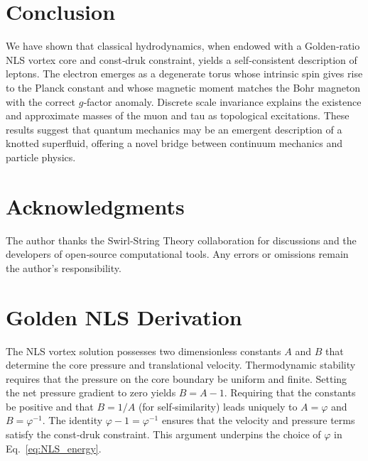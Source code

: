 \documentclass[11pt]{article}
\newcommand{\phiG}{\varphi}
\begin{document}


\section{Conclusion}


We have shown that classical hydrodynamics, when endowed with a Golden‑ratio NLS vortex core and const‑druk constraint, yields a self‑consistent description of leptons.  The electron emerges as a degenerate torus whose intrinsic spin gives rise to the Planck constant and whose magnetic moment matches the Bohr magneton with the correct $g$‑factor anomaly.  Discrete scale invariance explains the existence and approximate masses of the muon and tau as topological excitations.  These results suggest that quantum mechanics may be an emergent description of a knotted superfluid, offering a novel bridge between continuum mechanics and particle physics.






\section*{Acknowledgments}


The author thanks the Swirl‑String Theory collaboration for discussions and the developers of open‑source computational tools.  Any errors or omissions remain the author's responsibility.






\appendix






\section{Golden NLS Derivation}


\label{app:golden}


The NLS vortex solution possesses two dimensionless constants $A$ and $B$ that determine the core pressure and translational velocity.  Thermodynamic stability requires that the pressure on the core boundary be uniform and finite.  Setting the net pressure gradient to zero yields $B = A - 1$.  Requiring that the constants be positive and that $B = 1/A$ (for self‑similarity) leads uniquely to $A = \phiG$ and $B = \phiG^{-1}$.  The identity $\phiG - 1 = \phiG^{-1}$ ensures that the velocity and pressure terms satisfy the const‑druk constraint.  This argument underpins the choice of $\phiG$ in Eq.~\eqref{eq:NLS_energy}.
\end{document}
